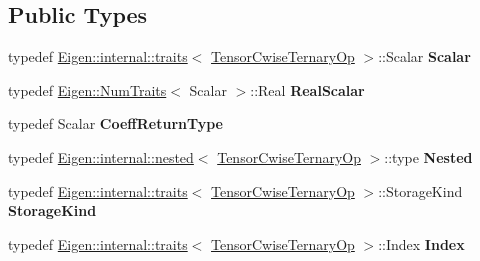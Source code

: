\subsection*{Public Types}
\begin{DoxyCompactItemize}
\item 
\mbox{\label{class_eigen_1_1_tensor_cwise_ternary_op_aa614f75a90955515aca655c235c265a7}} 
typedef \hyperlink{struct_eigen_1_1internal_1_1traits}{Eigen\+::internal\+::traits}$<$ \hyperlink{class_eigen_1_1_tensor_cwise_ternary_op}{Tensor\+Cwise\+Ternary\+Op} $>$\+::Scalar {\bfseries Scalar}
\item 
\mbox{\label{class_eigen_1_1_tensor_cwise_ternary_op_a699120599172d21e180c1d225d5be8d3}} 
typedef \hyperlink{group___core___module_struct_eigen_1_1_num_traits}{Eigen\+::\+Num\+Traits}$<$ Scalar $>$\+::Real {\bfseries Real\+Scalar}
\item 
\mbox{\label{class_eigen_1_1_tensor_cwise_ternary_op_a635a3636bd33daf89bd3b8ba7ce8d8d3}} 
typedef Scalar {\bfseries Coeff\+Return\+Type}
\item 
\mbox{\label{class_eigen_1_1_tensor_cwise_ternary_op_af36d41e63405bbc2d9f04459fdba127d}} 
typedef \hyperlink{struct_eigen_1_1internal_1_1nested}{Eigen\+::internal\+::nested}$<$ \hyperlink{class_eigen_1_1_tensor_cwise_ternary_op}{Tensor\+Cwise\+Ternary\+Op} $>$\+::type {\bfseries Nested}
\item 
\mbox{\label{class_eigen_1_1_tensor_cwise_ternary_op_a253e04fe3005aaf9836d44e60e9bba5a}} 
typedef \hyperlink{struct_eigen_1_1internal_1_1traits}{Eigen\+::internal\+::traits}$<$ \hyperlink{class_eigen_1_1_tensor_cwise_ternary_op}{Tensor\+Cwise\+Ternary\+Op} $>$\+::Storage\+Kind {\bfseries Storage\+Kind}
\item 
\mbox{\label{class_eigen_1_1_tensor_cwise_ternary_op_aa2c55a3cab4374f31060a8f68791966e}} 
typedef \hyperlink{struct_eigen_1_1internal_1_1traits}{Eigen\+::internal\+::traits}$<$ \hyperlink{class_eigen_1_1_tensor_cwise_ternary_op}{Tensor\+Cwise\+Ternary\+Op} $>$\+::Index {\bfseries Index}
\item 

\end{DoxyCompactItemize}
